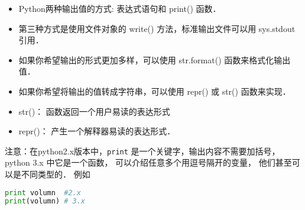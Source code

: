
\begin{issues}
\issueTODO
\issueDraft
\end{issues}


\begin{itemize}
\item Python两种输出值的方式: 表达式语句和 print() 函数．
\item 第三种方式是使用文件对象的 write() 方法，标准输出文件可以用 sys.stdout 引用．
\item 如果你希望输出的形式更加多样，可以使用 str.format() 函数来格式化输出值．
\item 如果你希望将输出的值转成字符串，可以使用 repr() 或 str() 函数来实现．
\end{itemize}

\begin{itemize}
\item str()： 函数返回一个用户易读的表达形式
\item repr()： 产生一个解释器易读的表达形式．
\end{itemize}

注意：在python2.x版本中，\verb|print| 是一个关键字，输出内容不需要加括号， python 3.x 中它是一个函数， 可以介绍任意多个用逗号隔开的变量， 他们甚至可以是不同类型的． 例如
\begin{lstlisting}[language=python]
print volumn  #2.x
print(volumn) # 3.x
\end{lstlisting}
